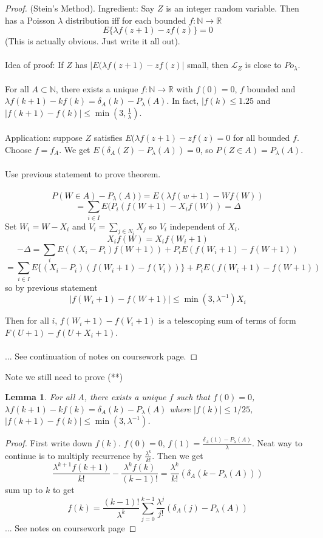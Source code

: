 \documentclass[12pt]{article}
\newtheorem{lemma}{Lemma}
\begin{document}
\begin{proof}
(Stein's Method).  Ingredient: Say $Z$ is an integer random variable.  Then has a Poisson $\lambda$ distribution iff for each bounded $f: \mathbb{N} \to \mathbb{R}$
$$E \{ \lambda f(z+1)- z f(z) \} = 0$$
(This is actually obvious.  Just write it all out).
\\ \\
Idea of proof:  If $Z$ has $|E( \lambda f(z+1) - z f(z) |$ small, then $\mathcal{L}_Z$ is close to $Po_\lambda$.  
\\ \\
For all $A \subset \mathbb{N}$, there exists a unique $f : \mathbb{N} \to \mathbb{R}$ with $f(0) = 0$, $f$ bounded and $\lambda f(k+1) - k f(k) = \delta_A(k) - P_\lambda(A)$.  In fact, $|f(k) \le 1.25$ and $|f(k+1) - f(k)| \le \min(3, \frac{1}{\lambda})$.
\\ \\
Application: suppose $Z$ satisfies $E(\lambda f(z+1) - z f(z) = 0$ for all bounded $f$.  Choose $f = f_A$.  We get $E(\delta_A(Z) - P_\lambda(A)) = 0$, so $P(Z \in A) = P_\lambda(A)$.
\\ \\
Use previous statement to prove theorem.
\\ \\
$$P(W \in A) - P_\lambda(A)) = E ( \lambda f(w + 1) - Wf(W))$$
$$ = \sum_{i \in I} E(P_i(f(W + 1) - X_i f(W) ) = \Delta$$
Set $W_i = W - X_i$ and $V_i = \sum_{j \in N_i} X_j$ so $V_i$ independent of $X_i$.
$$X_i f(W) = X_i f(W_i + 1)$$
$$-\Delta = \sum_i E((X_i - P_i) f(W + 1)) + P_i E(f(W_i+1) - f(W+1))$$
$$ = \sum_{i \in I} E \{ (X_i - P_i) ( f(W_i + 1) - f(V_i) ) \} + P_i E(f(W_i + 1) - f(W + 1))$$
so by previous statement
$$|f(W_i + 1) - f(W + 1) | \le \min(3, \lambda^{-1}) X_i$$

Then for all $i$, $f(W_i + 1) - f(V_i + 1)$ is a telescoping sum of terms of form $F(U + 1) - f(U + X_i + 1)$.
\\ \\
... See continuation of notes on coursework page.
\end{proof}

Note we still need to prove (**)
\begin{lemma}
For all $A$, there exists a unique $f$ such that $f(0) = 0$, $\lambda f(k+1) - k f(k) = \delta_A(k) - P_{\lambda}(A)$ where $|f(k) | \le 1/25$, $|f(k+1) - f(k) | \le \min(3, \lambda^{-1})$.
\end{lemma}
\begin{proof}
First write down $f(k)$.  $f(0) = 0$, $f(1) = \frac{ \delta_A(1) - P_\lambda(A) }{\lambda}$.  Neat way to continue is to multiply recurrence by $\frac{\lambda^k}{k!}$.  Then we get
$$\frac{\lambda^{k+1} f(k+1)}{k!} - \frac{\lambda^k f(k)}{(k-1)!} = \frac{\lambda^k}{k!} (\delta_A(k - P_\lambda(A)))$$
sum up to $k$ to get
$$f(k) = \frac{(k-1)!}{\lambda^k} \sum_{j=0}^{k-1} \frac{\lambda^j}{j!} (\delta_A(j) - P_\lambda(A))$$
... See notes on coursework page

\end{proof}
\end{document}
